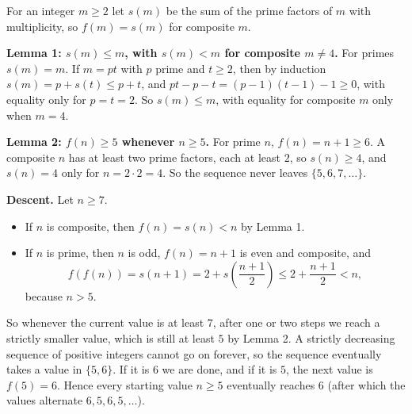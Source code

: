 For an integer $m\ge2$ let $s(m)$ be the sum of the prime factors of $m$ with multiplicity, so $f(m)=s(m)$ for composite $m$.

\textbf{Lemma 1: $s(m)\le m$, with $s(m)<m$ for composite $m\ne4$.} For primes $s(m)=m$. If $m=pt$ with $p$ prime and $t\ge2$, then by induction $s(m)=p+s(t)\le p+t$, and $pt-p-t=(p-1)(t-1)-1\ge0$, with equality only for $p=t=2$. So $s(m)\le m$, with equality for composite $m$ only when $m=4$.

\textbf{Lemma 2: $f(n)\ge5$ whenever $n\ge5$.} For prime $n$, $f(n)=n+1\ge6$. A composite $n$ has at least two prime factors, each at least $2$, so $s(n)\ge4$, and $s(n)=4$ only for $n=2\cdot2=4$. So the sequence never leaves $\{5,6,7,\dots\}$.

\textbf{Descent.} Let $n\ge7$.
\begin{itemize}
\item If $n$ is composite, then $f(n)=s(n)<n$ by Lemma 1.
\item If $n$ is prime, then $n$ is odd, $f(n)=n+1$ is even and composite, and
\[
f(f(n))=s(n+1)=2+s\left(\dfrac{n+1}{2}\right)\le2+\dfrac{n+1}{2}<n,
\]
because $n>5$.
\end{itemize}
So whenever the current value is at least $7$, after one or two steps we reach a strictly smaller value, which is still at least $5$ by Lemma 2. A strictly decreasing sequence of positive integers cannot go on forever, so the sequence eventually takes a value in $\{5,6\}$. If it is $6$ we are done, and if it is $5$, the next value is $f(5)=6$. Hence every starting value $n\ge5$ eventually reaches $\boxed{6}$ (after which the values alternate $6,5,6,5,\dots$).
